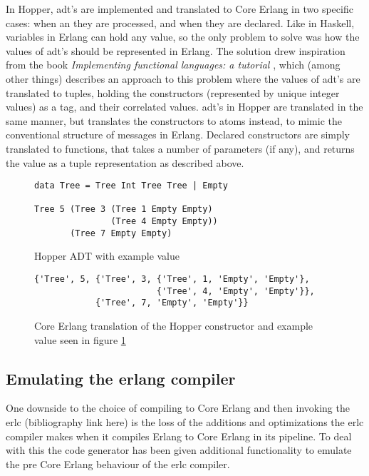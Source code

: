 In Hopper, \gls{adt}'s are implemented and translated to Core Erlang in two specific cases: when an
they are processed, and when they are declared. Like in Haskell, variables in Erlang can
hold any value, so the only problem to solve was how the values of \gls{adt}'s should be represented in
Erlang. The solution drew inspiration from the book \textit{Implementing functional languages: a tutorial} \cite{FunTutorial},
which (among other things) describes an approach to this problem where the values of \gls{adt}'s are translated to tuples,
holding the constructors (represented by unique integer values) as a tag, and their correlated values.
\gls{adt}'s in Hopper are translated in the same manner, but translates the constructors to atoms instead,
to mimic the conventional structure of messages in Erlang.
Declared constructors are simply translated to functions, that takes a number of parameters (if any), and
returns the value as a tuple representation as described above.


\begin{figure}[!htb]
\centering
\begin{lstlisting} 
data Tree = Tree Int Tree Tree | Empty

Tree 5 (Tree 3 (Tree 1 Empty Empty) 
               (Tree 4 Empty Empty)) 
       (Tree 7 Empty Empty)
\end{lstlisting}
\caption{Hopper ADT with example value}
\label{lst:hopperAdt}
\end{figure}

\begin{figure}[!htb]
\centering
\begin{lstlisting} 
{'Tree', 5, {'Tree', 3, {'Tree', 1, 'Empty', 'Empty'},
                        {'Tree', 4, 'Empty', 'Empty'}},
            {'Tree', 7, 'Empty', 'Empty'}}
\end{lstlisting}
\caption[Core Erlang translation of constructor and example value]
 {Core Erlang translation of the Hopper constructor and example value seen in figure \ref{lst:hopperAdt}}
\label{lst:coreAdt}
\end{figure}


\subsection{Emulating the erlang compiler}

One downside to the choice of compiling to Core Erlang and then invoking the erlc
(bibliography link here) is the loss of the additions and optimizations the erlc
compiler makes when it compiles Erlang to Core Erlang in its pipeline. To deal with this
the code generator has been given additional functionality to emulate the pre Core Erlang
behaviour of the erlc compiler. 